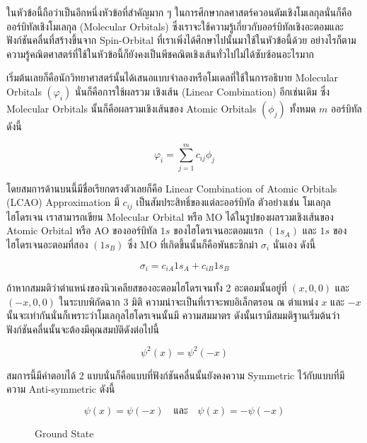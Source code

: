 ในหัวข้อนี้ถือว่าเป็นอีกหนึ่งหัวข้อที่สำคัญมาก ๆ ในการศึกษากลศาสตร์ควอนตัมเชิงโมเลกุลนั่นก็คือออร์บิทัลเชิงโมเลกุล (Molecular Orbitals)
ซึ่งเราจะใช้ความรู้เกี่ยวกับออร์บิทัลเชิงอะตอมและฟังก์ชันคลื่นที่สร้างขึ้นจาก Spin-Orbital ที่เราเพิ่งได้ศึกษาไปนั้นมาใช้ในหัวข้อนี้ด้วย
อย่างไรก็ตาม ความรู้คณิตศาสตร์ที่ใช้ในหัวข้อนี้ก็ยังคงเป็นพีชคณิตเชิงเส้นทั่วไปไม่ได้ซับซ้อนอะไรมาก

เริ่มต้นเลยก็คือนักวิทยาศาสตร์นั้นได้เสนอแบบจำลองหรือโมเดลที่ใช้ในการอธิบาย Molecular Orbitals $(\varphi_i)$ นั่นก็คือการใช้ผลรวม%
เชิงเส้น (Linear Combination) อีกเช่นเดิม ซึ่ง Molecular Orbitals นั้นก็คือผลรวมเชิงเส้นของ Atomic Orbitals $(\phi_j)$ ทั้งหมด
$m$ ออร์บิทัล ดังนี้

\begin{equation}
    \label{eq:LCAO}
    \varphi_i = \sum_{j=1}^m c_{i j} \phi_j
\end{equation}

\noindent โดยสมการด้านบนนี้มีชื่อเรียกตรงตัวเลยก็คือ Linear Combination of Atomic Orbitals (LCAO) Approximation
มี $c_{i j}$ เป็นสัมประสิทธิ์ของแต่ละออร์บิทัล ตัวอย่างเช่น โมเลกุลไฮโดรเจน  เราสามารถเขียน Molecular Orbital หรือ MO
ได้ในรูปของผลรวมเชิงเส้นของ Atomic Orbital หรือ AO ของออร์บิทัล $1 s$ ของไฮโดรเจนอะตอมแรก $(1 s_A)$ และ $1 s$
ของไฮโดรเจนอะตอมที่สอง $(1 s_B)$ ซึ่ง MO ที่เกิดขึ้นนั้นก็คือพันธะซิกม่า $\sigma_i$ นั่นเอง ดังนี้

\begin{equation}
    \sigma_i = c_{i A} 1 s_A+c_{i B} 1 s_B
\end{equation}

ถ้าหากสมมติว่าตำแหน่งของนิวเคลียสของอะตอมไฮโดรเจนทั้ง 2 อะตอมนั้นอยู่ที่ $\left(x, 0,0\right)$ และ $\left(-x, 0,0\right)$
ในระบบพิกัดฉาก 3 มิติ ความน่าจะเป็นที่เราจะพบอิเล็กตรอน ณ ตำแหน่ง $x$ และ $-x$ นั้นจะเท่ากันนั่นก็เพราะว่าโมเลกุลไฮโดรเจนนั้นมี%
ความสมมาตร ดังนั้นเรามีสมมติฐานเริ่มต้นว่าฟังก์ชันคลื่นนั้นจะต้องมีคุณสมบัติดังต่อไปนี้

\begin{equation}
    \psi^2(x) = \psi^2(-x)
\end{equation}

\noindent สมการนี้มีคำตอบได้ 2 แบบนั่นก็คือแบบที่ฟังก์ชันคลื่นนั้นยังคงความ Symmetric ไว้กับแบบที่มีความ Anti-symmetric ดังนี้

\begin{equation}
    \psi(x) = \psi(-x)
    \quad \text{และ} \quad
    \psi(x) = -\psi(-x)
\end{equation}

\begin{figure}[htbp]
    \label{fig:MO_H2_ground}
    \centering
    \begin{MOdiagram}[names,style=square]
    \end{MOdiagram}
    \caption{Ground State}
\end{figure}

